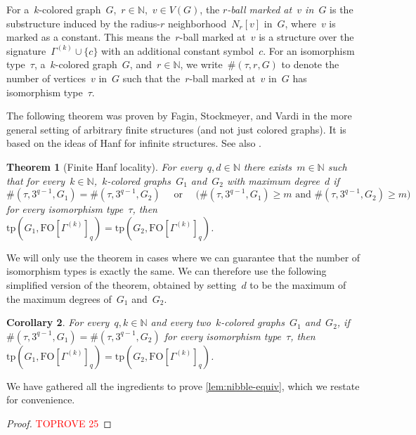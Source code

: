 \documentclass[11pt]{article}      \usepackage[margin=1in]{geometry}  \usepackage{microtype}
\newtheorem{theorem}{Theorem}[section]
\newtheorem{corollary}[theorem]{Corollary}
\theoremstyle{definition}
\newcommand{\N}[0]{\mathrm{\mathbb{N}}}
\newcommand{\tp}{\mathrm{tp}}
\newcommand{\FO}{\mathrm{FO}}
\renewcommand{\ge}{\geqslant}
\renewcommand{\geq}{\ge}
\begin{document}
For a~$k$-colored graph~$G$,~$r\in \N$,~$v\in V(G)$, the \emph{$r$-ball marked at~$v$ in~$G$} is the substructure induced by the radius-$r$ neighborhood~$N_r[v]$ in~$G$, where~$v$ is marked as a constant.
This means the~$r$-ball marked at~$v$ is a structure over the signature~$\Gamma^{(k)} \cup \{c\}$ with an additional constant symbol~$c$.
For an isomorphism type~$\tau$, a~$k$-colored graph~$G$, and~$r\in\N$, we write~$\#(\tau,r,G)$ to denote the number of vertices~$v$ in~$G$ such that the~$r$-ball marked at~$v$ in~$G$ has isomorphism type~$\tau$.

The following theorem was proven by Fagin, Stockmeyer, and Vardi \cite[Thm.\ 4.3]{FAGIN199578} in the more general setting of arbitrary finite structures (and not just colored graphs).
It is based on the ideas of Hanf \cite{HANF2014132} for infinite structures.
See also \cite[Thm.\ 4.24]{libkin2004elements}.



\begin{theorem}[Finite Hanf locality]
    For every~$q,d \in \N$ there exists~$m\in\N$ such that for every~$k\in\N$,~$k$-colored graphs~$G_1$ and~$G_2$ with maximum degree~$d$ if 
    \[
        \#(\tau,3^{q-1},G_1) = \#(\tau,3^{q-1},G_2)
        \quad \text{ or } \quad
        \big(
            \#(\tau,3^{q-1},G_1)\geq m  \text{ and }\#(\tau,3^{q-1},G_2) \geq m    
        \big)
    \]
    for every isomorphism type~$\tau$, then 
   ~$\tp(G_1,\FO[\Gamma^{(k)}]_q) = \tp(G_2,\FO[\Gamma^{(k)}]_q)$.
\end{theorem}

We will only use the theorem in cases where we can guarantee that the number of isomorphism types is exactly the same.
We can therefore use the following simplified version of the theorem, obtained by setting~$d$ to be the maximum of the maximum degrees of~$G_1$ and~$G_2$.

\begin{corollary}\label{cor:hanf}
    For every~$q,k\in \N$ and every two~$k$-colored graphs~$G_1$ and~$G_2$,
    if~$\#(\tau,3^{q-1},G_1) = \#(\tau,3^{q-1},G_2)$ for every isomorphism type~$\tau$, then~$\tp(G_1,\FO[\Gamma^{(k)}]_q) = \tp(G_2,\FO[\Gamma^{(k)}]_q)$.
\end{corollary}

We have gathered all the ingredients to prove \cref{lem:nibble-equiv}, which we restate for convenience.

\lemNibbleEquiv*

\begin{proof}\textcolor{red}{TOPROVE 25}\end{proof}
\end{document}
